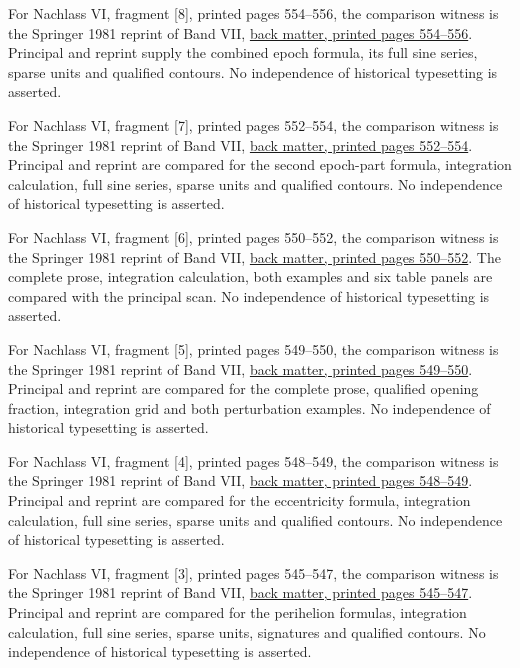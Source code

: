 For Nachlass VI, fragment [8], printed pages 554–556, the comparison witness is the Springer 1981 reprint of Band VII, \href{https://link.springer.com/content/pdf/bbm:978-3-642-92478-1/1}{back matter, printed pages 554–556}. Principal and reprint supply the combined epoch formula, its full sine series, sparse units and qualified contours. No independence of historical typesetting is asserted.



For Nachlass VI, fragment [7], printed pages 552–554, the comparison witness is the Springer 1981 reprint of Band VII, \href{https://link.springer.com/content/pdf/bbm:978-3-642-92478-1/1}{back matter, printed pages 552–554}. Principal and reprint are compared for the second epoch-part formula, integration calculation, full sine series, sparse units and qualified contours. No independence of historical typesetting is asserted.



For Nachlass VI, fragment [6], printed pages 550–552, the comparison witness is the Springer 1981 reprint of Band VII, \href{https://link.springer.com/content/pdf/bbm:978-3-642-92478-1/1}{back matter, printed pages 550–552}. The complete prose, integration calculation, both examples and six table panels are compared with the principal scan. No independence of historical typesetting is asserted.



For Nachlass VI, fragment [5], printed pages 549–550, the comparison witness is the Springer 1981 reprint of Band VII, \href{https://link.springer.com/content/pdf/bbm:978-3-642-92478-1/1}{back matter, printed pages 549–550}. Principal and reprint are compared for the complete prose, qualified opening fraction, integration grid and both perturbation examples. No independence of historical typesetting is asserted.



For Nachlass VI, fragment [4], printed pages 548–549, the comparison witness is the Springer 1981 reprint of Band VII, \href{https://link.springer.com/content/pdf/bbm:978-3-642-92478-1/1}{back matter, printed pages 548–549}. Principal and reprint are compared for the eccentricity formula, integration calculation, full sine series, sparse units and qualified contours. No independence of historical typesetting is asserted.



For Nachlass VI, fragment [3], printed pages 545–547, the comparison witness is the Springer 1981 reprint of Band VII, \href{https://link.springer.com/content/pdf/bbm:978-3-642-92478-1/1}{back matter, printed pages 545–547}. Principal and reprint are compared for the perihelion formulas, integration calculation, full sine series, sparse units, signatures and qualified contours. No independence of historical typesetting is asserted.



